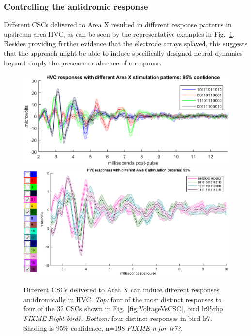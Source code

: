 \documentclass[10pt,letterpaper]{article}
\newcommand\fig[1]{Fig.~\ref{#1}}
\begin{document}
\subsubsection{Controlling the antidromic response}

Different CSCs delivered to Area X resulted in different response
patterns in upstream area HVC, as can be seen by the representative
examples in \fig{fig:HVCresponseVsCSC}. Besides providing further
evidence that the electrode arrays splayed, this suggests that the
approach might be able to induce specifically designed neural dynamics
beyond simply the presence or absence of a response.

\begin{figure}
  \includegraphics[width=\textwidth]{HVCresponseVsCSC}
  \includegraphics[width=\textwidth]{lr7-unique-responses-10-07-a}
  \caption{Different CSCs delivered to Area X can induce different
    responses antidromically in HVC.  {\em Top:} four of the most
    distinct responses to four of the 32 CSCs shown in
    \fig{fig:VoltageVsCSC}, bird lr95rhp {\em FIXME Right bird?}.
        {\em Bottom:} four distinct responses in bird lr7. Shading is
        95\% confidence, n=198 {\em FIXME n for lr7?}.}
  \label{fig:HVCresponseVsCSC}
\end{figure}
\end{document}
